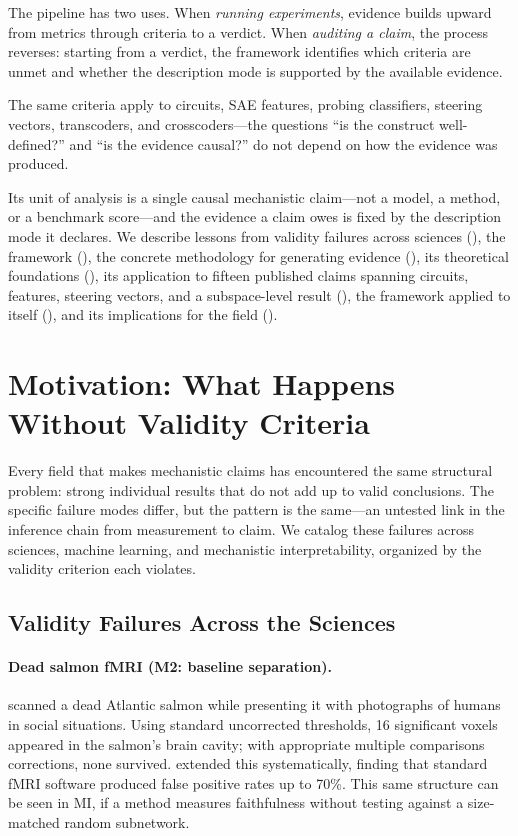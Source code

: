 \documentclass{article}
\begin{document}
The pipeline has two uses. When \emph{running experiments}, evidence builds upward from metrics through criteria to a verdict. When \emph{auditing a claim}, the process reverses: starting from a verdict, the framework identifies which criteria are unmet and whether the description mode is supported by the available evidence.

The same criteria apply to circuits, SAE features, probing classifiers, steering vectors, transcoders, and crosscoders---the questions ``is the construct well-defined?'' and ``is the evidence causal?'' do not depend on how the evidence was produced.

Its unit of analysis is a single causal mechanistic claim---not a model, a method, or a benchmark score---and the evidence a claim owes is fixed by the description mode it declares. We describe lessons from validity failures across sciences (), the framework (), the concrete methodology for generating evidence (), its theoretical foundations (), its application to fifteen published claims spanning circuits, features, steering vectors, and a subspace-level result (), the framework applied to itself (), and its implications for the field ().


\section{Motivation: What Happens Without Validity Criteria}
\label{sec:motivation}

Every field that makes mechanistic claims has encountered the same structural problem: strong individual results that do not add up to valid conclusions. The specific failure modes differ, but the pattern is the same---an untested link in the inference chain from measurement to claim. We catalog these failures across sciences, machine learning, and mechanistic interpretability, organized by the validity criterion each violates.

\subsection{Validity Failures Across the Sciences}

\paragraph{Dead salmon fMRI (M2: baseline separation).}
\citet{bennett2010neural} scanned a dead Atlantic salmon while presenting it with photographs of humans in social situations. Using standard uncorrected thresholds, 16 significant voxels appeared in the salmon's brain cavity; with appropriate multiple comparisons corrections, none survived. \citet{eklund2016cluster} extended this systematically, finding that standard fMRI software produced false positive rates up to 70\%. This same structure can be seen in MI, if a method measures faithfulness without testing against a size-matched random subnetwork.
\end{document}
